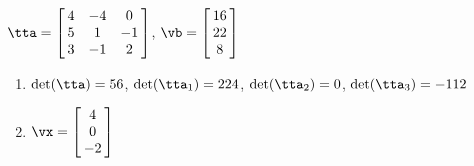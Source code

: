 {$\tta = \left[\hskip -3pt \begin{array}{ccc} 4&-4&0\\  5&1&-1
\\  3&-1&2\end{array}\hskip -3pt \right] $,
 \quad
$\vb = \left[\hskip -3pt \begin{array}{c} 16\\  22\\  
8\end{array}\hskip -3pt \right] $}
{\begin{enumerate}
\item	$\det(\tta) = 56$, $\det(\tta_1) = 224$, $\det(\tta_2) = 0$, $\det(\tta_3) = -112$
\item $\vx = \left[\hskip -3pt \begin{array}{c} 4\\  0\\  -2
\end{array}\hskip -3pt \right]$
\end{enumerate}
}


 

 


